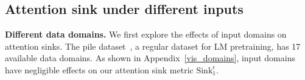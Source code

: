     







\vspace{-0.2cm}
\subsection{Attention sink under different inputs}\label{section3_3}
\vspace{-0.2cm}

\textbf{Different data domains.} We first explore the effects of input domains on attention sinks. The pile dataset~\citep{gao2020pile}, a regular dataset for LM pretraining, has 17 available data domains. As shown in Appendix~\ref{vis_domains}, input domains have negligible effects on our attention sink metric $\textrm{Sink}_1^{\epsilon}$. 




